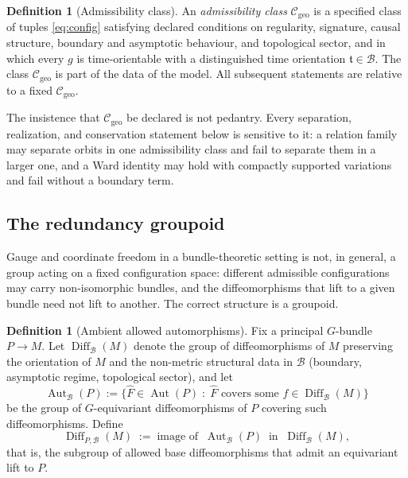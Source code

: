 \documentclass[11pt,a4paper]{article}
\theoremstyle{plain}
\theoremstyle{definition}
\newtheorem{definition}[theorem]{Definition}
\theoremstyle{remark}
\newcommand{\Cgeo}{\mathcal{C}_{\mathrm{geo}}}
\newcommand{\Aut}{\operatorname{Aut}}
\newcommand{\AutB}{\operatorname{Aut}_{\mathcal{B}}}
\newcommand{\Diff}{\operatorname{Diff}}
\begin{document}
\begin{definition}[Admissibility class]
\label{def:admissible}
An \emph{admissibility class} $\Cgeo$ is a specified class of tuples \eqref{eq:config}
satisfying declared conditions on regularity, signature, causal structure, boundary and
asymptotic behaviour, and topological sector, and in which every $g$ is time-orientable with a
distinguished time orientation $\mathfrak{t}\in\mathcal{B}$. The class $\Cgeo$ is part of the
data of the model. All subsequent statements are relative to a fixed $\Cgeo$.
\end{definition}

The insistence that $\Cgeo$ be declared is not pedantry. Every separation, realization, and
conservation statement below is sensitive to it: a relation family may separate orbits in one
admissibility class and fail to separate them in a larger one, and a Ward identity may hold with
compactly supported variations and fail without a boundary term.

\subsection{The redundancy groupoid}

Gauge and coordinate freedom in a bundle-theoretic setting is not, in general, a group acting
on a fixed configuration space: different admissible configurations may carry non-isomorphic
bundles, and the diffeomorphisms that lift to a given bundle need not lift to another. The
correct structure is a groupoid.

\begin{definition}[Ambient allowed automorphisms]
\label{def:ambient-aut}
Fix a principal $G$-bundle $P\to M$. Let $\Diff_{\mathcal{B}}(M)$ denote the group of
diffeomorphisms of $M$ preserving the orientation of $M$ and the non-metric structural data in
$\mathcal{B}$ (boundary, asymptotic regime, topological sector), and let
\begin{equation}
\label{eq:AutB}
\AutB(P)
:=\bigl\{\hat F\in\Aut(P)\;:\;\hat F \text{ covers some } f\in\Diff_{\mathcal{B}}(M)\bigr\}
\end{equation}
be the group of $G$-equivariant diffeomorphisms of $P$ covering such diffeomorphisms. Define
\begin{equation}
\label{eq:DiffPB}
\Diff_{P,\mathcal{B}}(M)\;:=\;\text{image of }\ \AutB(P)\ \text{ in }\ \Diff_{\mathcal{B}}(M),
\end{equation}
that is, the subgroup of allowed base diffeomorphisms that admit an equivariant lift to $P$.
\end{definition}
\end{document}
